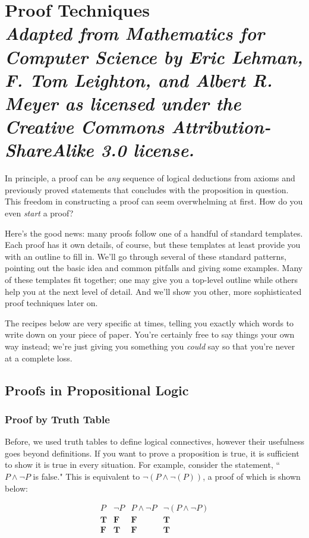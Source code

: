 \documentclass[11pt,oneside]{book}
\theoremstyle{definition}
\newcommand{\T}{\mathbf{T}}
\newcommand{\F}{\mathbf{F}}
\begin{document}
\chapter[Proof Techniques]{Proof Techniques\\[0.5ex]
\normalsize\normalfont\textit{
    Adapted from \emph{Mathematics for Computer Science} by Eric Lehman, F. Tom Leighton, and Albert R. Meyer as licensed under the Creative Commons Attribution-ShareAlike 3.0 license.
}}

In principle, a proof can be \emph{any} sequence of logical deductions from axioms and previously proved statements that concludes with the proposition in question.
This freedom in constructing a proof can seem overwhelming at first.
How do you even \emph{start} a proof?

Here's the good news: many proofs follow one of a handful of standard templates.
Each proof has it own details, of course, but these templates at least provide you with an outline to fill in.
We'll go through several of these standard patterns, pointing out the basic idea and common pitfalls and giving some examples.
Many of these templates fit together; one may give you a top-level outline while others help you at the next level of detail.
And we'll show you other, more sophisticated proof techniques later on.

The recipes below are very specific at times, telling you exactly which words to write down on your piece of paper.
You're certainly free to say things your own way instead; we're just giving you something you \emph{could} say so that you're never at a complete loss.


\section{Proofs in Propositional Logic}
\subsection{Proof by Truth Table}\label{sec:TruthTable}
Before, we used truth tables to define logical connectives, however their usefulness goes beyond definitions.
If you want to prove a proposition is true, it is sufficient to show it is true in every situation.
For example, consider the statement, ``$P \land \lnot P$ is false."
This is equivalent to $\lnot(P \land \lnot(P))$, a proof of which is shown below:

\[\begin{array}{c|c|c|c}
P & \lnot P & P \land \lnot P & \lnot(P \land \lnot P) \\
\hline
\T & \F & \F & \T \\
\F & \T & \F & \T
\end{array}\]
\end{document}
